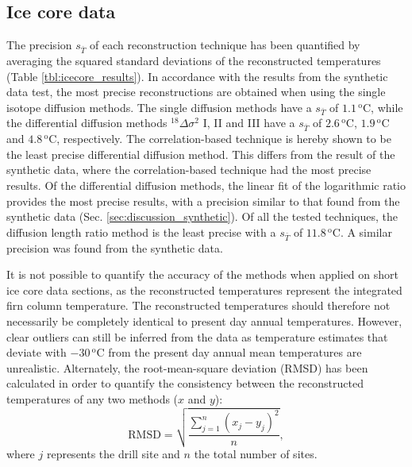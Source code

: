 \documentclass[11pt, draftcls, onecolumn]{IEEEtran} %
\numberwithin{equation}{section}
\numberwithin{table}{section}
\numberwithin{figure}{section}
\begin{document}
\subsection{Ice core data}\label{sec:discussion_icecore}
The precision $s_{\bar{T}}$ of each reconstruction technique has been quantified
by averaging the squared standard deviations of the reconstructed temperatures (Table \ref{tbl:icecore_results}). 
In accordance with the results from the synthetic data test, the most precise reconstructions are obtained when using the single isotope diffusion methods. 
The single diffusion methods have a $s_{\bar{T}}$ of $1.1\,^\mathrm{o}\mathrm{C}$, while the differential diffusion methods ${}^{18}\Delta\sigma^2$ I, II and III
have a $s_{\bar{T}}$ of $2.6\,^\mathrm{o}\mathrm{C}$,
$1.9\,^\mathrm{o}\mathrm{C}$ and $4.8\,^\mathrm{o}\mathrm{C}$, respectively.
The correlation-based technique is hereby shown to be the least precise differential diffusion method.
This differs from the result of the synthetic data, where the correlation-based technique
had the most precise results. 
Of the differential diffusion methods, the linear fit of the logarithmic ratio provides the most precise results, 
with a precision similar to that found from the synthetic data (Sec. \ref{sec:discussion_synthetic}).
Of all the tested techniques, the diffusion length ratio method is the least precise with 
a $s_{\bar{T}}$ of $11.8\,^\mathrm{o}\mathrm{C}$. 
A similar precision was found from the synthetic data.

It is not possible to quantify the accuracy of the methods when applied on short ice core data sections,
as the reconstructed temperatures represent the integrated firn column temperature.
The reconstructed temperatures should therefore not necessarily be completely identical to present day annual temperatures.
However, clear outliers can still be inferred from the data as temperature estimates that deviate with
$-30\,^\mathrm{o}\mathrm{C}$ from the present day annual mean temperatures are unrealistic.
Alternately, the root-mean-square deviation (RMSD) has been calculated in order to quantify the consistency between the
reconstructed temperatures of any two methods ($x$ and $y$):
\begin{equation}
\mathrm{RMSD} = \sqrt{\frac{\sum_{j = 1}^{n} \left(x_j - y_j\right)^2}{n}},
\end{equation}
where $j$ represents the drill site and $n$ the total number of sites.
\end{document}
